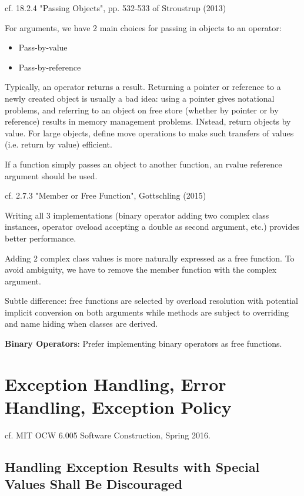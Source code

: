 \documentclass[10pt]{amsart}
\begin{document}
\begin{multicols*}{2}
cf. 18.2.4 "Passing Objects", pp. 532-533 of Stroustrup (2013) \cite{Stro2013}

For arguments, we have 2 main choices for passing in objects to an operator: 
\begin{itemize}
\item Pass-by-value
\item Pass-by-reference
\end{itemize}

Typically, an operator returns a result. Returning a pointer or reference to a newly created object is usually a bad idea: using a pointer gives notational problems, and referring to an object on free store (whether by pointer or by reference) results in memory management problems. INstead, return objects by value. For large objects, define move operations to make such transfers of values (i.e. return by value) efficient.

If a function simply passes an object to another function, an rvalue reference argument  should be used.

cf. 2.7.3 "Member or Free Function", Gottschling (2015) \cite{Gott2015}

Writing all 3 implementations (binary operator adding two complex class instances, operator oveload accepting a double as second argument, etc.) provides better performance.

Adding 2 complex class values is more naturally expressed as a free function. To avoid ambiguity, we have to remove the member function with the complex argument.

Subtle difference: free functions are selected by overload resolution with potential implicit conversion on both arguments while methods are subject to overriding and name hiding when classes are derived.

\textbf{Binary Operators}: Prefer implementing binary operators as free functions.




\section{Exception Handling, Error Handling, Exception Policy}

cf. MIT OCW 6.005 Software Construction, Spring 2016.

\subsection{Handling Exception Results with Special Values Shall Be Discouraged}


\end{multicols*}
\end{document}
